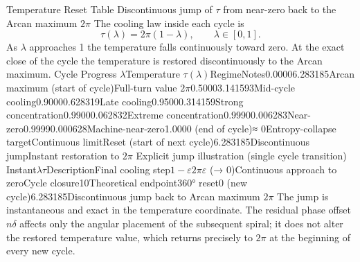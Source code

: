 Temperature Reset Table
Discontinuous jump of \(\tau\) from near-zero back to the Arcan maximum \(2\pi\)
The cooling law inside each cycle is
\[
\tau(\lambda) = 2\pi(1-\lambda), \qquad \lambda\in[0,1].
\]
As \(\lambda\) approaches 1 the temperature falls continuously toward zero. At the exact close of the cycle the temperature is restored discontinuously to the Arcan maximum.
Cycle Progress \(\lambda\)Temperature \(\tau(\lambda)\)RegimeNotes0.00006.283185Arcan maximum (start of cycle)Full-turn value \(2\pi\)0.50003.141593Mid-cycle cooling0.90000.628319Late cooling0.95000.314159Strong concentration0.99000.062832Extreme concentration0.99900.006283Near-zero0.99990.000628Machine-near-zero1.0000 (end of cycle)≈ 0Entropy-collapse targetContinuous limitReset (start of next cycle)6.283185Discontinuous jumpInstant restoration to \(2\pi\)
Explicit jump illustration (single cycle transition)
Instant\(\lambda\)\(\tau\)DescriptionFinal cooling step\(1 - \varepsilon\)\(2\pi\varepsilon\) (→ 0)Continuous approach to zeroCycle closure10Theoretical endpoint360° reset0 (new cycle)6.283185Discontinuous jump back to Arcan maximum \(2\pi\)
The jump is instantaneous and exact in the temperature coordinate. The residual phase offset \(n\delta\) affects only the angular placement of the subsequent spiral; it does not alter the restored temperature value, which returns precisely to \(2\pi\) at the beginning of every new cycle.

